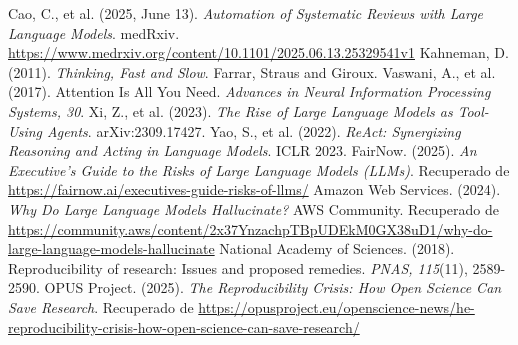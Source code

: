 \documentclass[11pt, a4paper]{article}
\begin{document}
\newpage
\begin{thebibliography}{99}
 Cao, C., et al. (2025, June 13). \textit{Automation of Systematic Reviews with Large Language Models}. medRxiv. \url{https://www.medrxiv.org/content/10.1101/2025.06.13.25329541v1}
 Kahneman, D. (2011). \textit{Thinking, Fast and Slow}. Farrar, Straus and Giroux.
 Vaswani, A., et al. (2017). Attention Is All You Need. \textit{Advances in Neural Information Processing Systems, 30}.
 Xi, Z., et al. (2023). \textit{The Rise of Large Language Models as Tool-Using Agents}. arXiv:2309.17427.
 Yao, S., et al. (2022). \textit{ReAct: Synergizing Reasoning and Acting in Language Models}. ICLR 2023.
 FairNow. (2025). \textit{An Executive's Guide to the Risks of Large Language Models (LLMs)}. Recuperado de \url{https://fairnow.ai/executives-guide-risks-of-llms/}
 Amazon Web Services. (2024). \textit{Why Do Large Language Models Hallucinate?} AWS Community. Recuperado de \url{https://community.aws/content/2x37YnzachpTBpUDEkM0GX38uD1/why-do-large-language-models-hallucinate}
 National Academy of Sciences. (2018). Reproducibility of research: Issues and proposed remedies. \textit{PNAS, 115}(11), 2589-2590.
 OPUS Project. (2025). \textit{The Reproducibility Crisis: How Open Science Can Save Research}. Recuperado de \url{https://opusproject.eu/openscience-news/he-reproducibility-crisis-how-open-science-can-save-research/}
\end{thebibliography}

\newpage
\appendix
\end{document}
